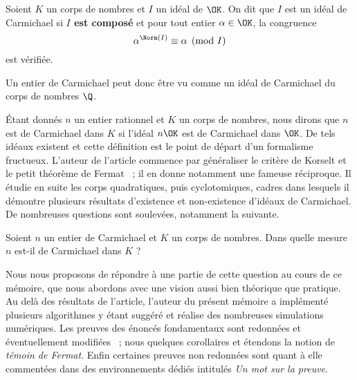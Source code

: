 \begin{definition} Soient $K$ un corps de nombres et $I$ un idéal de $\OK$. On dit que $I$ est un idéal de Carmichael si \textbf{$I$ est composé} et pour tout entier $\alpha \in \OK$, la congruence \[\alpha^{\Norm(I)} \equiv \alpha \pmod{I}\] est vérifiée.
\end{definition}

\begin{remarque}
	Un entier de Carmichael peut donc être vu comme un idéal de Carmichael du corps de nombres $\Q$.
\end{remarque}

Étant donnés $n$ un entier rationnel et $K$ un corps de nombres, nous dirons que $n$ est de Carmichael dans $K$ si l'idéal $n\OK$ est de Carmichael dans $\OK$. De tels idéaux existent et cette définition est le point de départ d'un formalisme fructueux. L'auteur de l'article commence par généraliser le critère de Korselt et le petit théorème de Fermat ~; il en donne notamment une fameuse réciproque. Il étudie en suite les corps quadratiques, puis cyclotomiques, cadres dans lesquels il démontre plusieurs résultats d'existence et non-existence d'idéaux de Carmichael. De nombreuses questions sont soulevées, notamment la suivante. 

\begin{question}\label{question-centrale}Soient $n$ un entier de Carmichael et $K$ un corps de nombres. Dans quelle mesure $n$ est-il de Carmichael dans $K$ ?
\end{question}

Nous nous proposons de répondre à une partie de cette question au cours de ce mémoire, que nous abordons avec une vision aussi bien théorique que pratique. Au delà des résultats de l'article, l'auteur du présent mémoire a implémenté plusieurs algorithmes y étant suggéré et réalise des nombreuses simulations numériques. Les preuves des énoncés fondamentaux sont redonnées et éventuellement modifiées ~; nous quelques corollaires et étendons la notion de \emph{témoin de Fermat}. Enfin certaines preuves non redonnées sont quant à elle commentées dans des environnements dédiés intitulés \textit{Un mot sur la preuve}.
